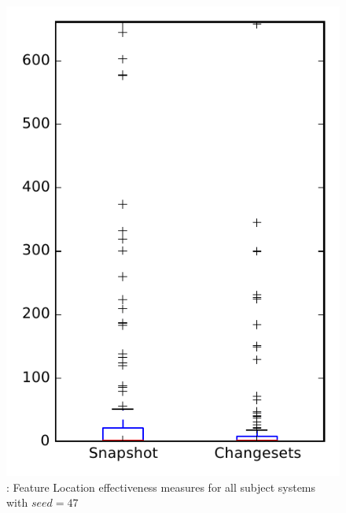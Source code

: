 
\begin{figure}
\centering
\includegraphics[height=0.4\textheight]{figures/flt_seed/rq1_overview_47}
\caption{\rone: Feature Location effectiveness measures for all subject systems with $seed=47$}
\label{fig:flt_seed:rq1:overview}
\end{figure}
